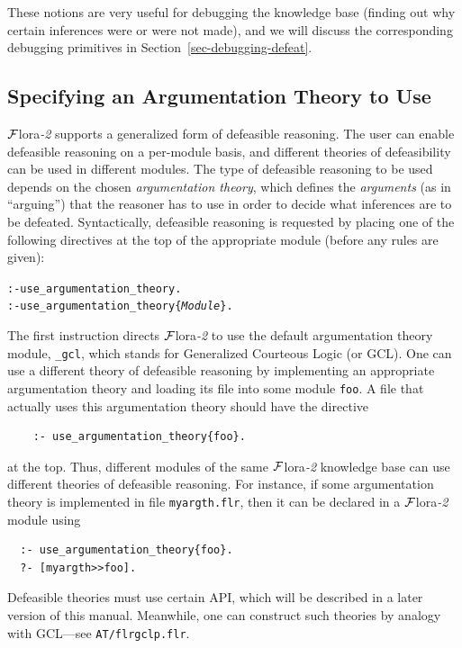 \documentclass[11pt]{article}
\newcommand{\FLORA}{{\mbox{\sc ${\cal F}${lora}\rm\emph{-2}}}\xspace}
\begin{document}
These notions are very useful for debugging the knowledge base (finding out why
certain inferences were or were not made), and we will discuss the
corresponding debugging primitives in Section~\ref{sec-debugging-defeat}.


\subsection{Specifying an Argumentation Theory to Use}

\FLORA supports a generalized form of defeasible reasoning.
The user can enable defeasible reasoning on a per-module basis, and
different theories of defeasibility can be used in different modules.
The type of defeasible reasoning to be used depends on the chosen
\emph{argumentation theory}, which defines the \emph{arguments} (as in
``arguing'') that the reasoner has to use in order to decide what inferences
are to be defeated. Syntactically, defeasible reasoning is requested
by placing one of the following directives at the top of the
appropriate module (before any rules are given):

\begin{alltt}
  :- use_argumentation_theory.
  :- use_argumentation_theory\{\emph{Module}\}.
\end{alltt}
The first instruction directs \FLORA to use the default argumentation theory
module, {\tt \_gcl}, which stands for Generalized Courteous Logic (or GCL).
One can use a different theory of defeasible reasoning by implementing an
appropriate argumentation theory and
loading its file into some module {\tt foo}.
A file that actually uses this argumentation theory should have
the directive
\begin{verbatim}
    :- use_argumentation_theory{foo}.
\end{verbatim}
at the top. Thus, different modules of the same \FLORA
knowledge base can use different theories of defeasible reasoning.
For instance, if some argumentation theory is implemented in file
\texttt{myargth.flr}, then it can be declared in a \FLORA module
using
\begin{verbatim}
  :- use_argumentation_theory{foo}.
  ?- [myargth>>foo].
\end{verbatim}

Defeasible theories must use certain API, which will
be described in a later version of this manual. Meanwhile, one can
construct such theories by analogy with GCL---see {\tt AT/flrgclp.flr}.  
\end{document}

